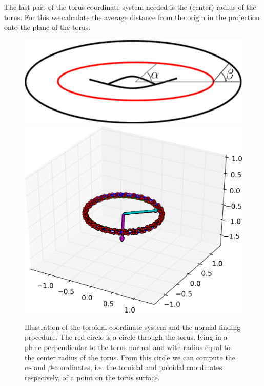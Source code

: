 \documentclass[a4paper]{article}
\begin{document}
The last part of the torus coordinate system needed is the (center) radius of the torus. For this we calculate the average distance from the origin in the projection onto the plane of the torus. %

\begin{figure}[!htb]
  \includegraphics[width=\linewidth]{Figures/TorusAlphaBeta.pdf}
\endminipage\hfill
{}
  \includegraphics[width=\linewidth]{Figures/torusfit3.png}
\endminipage
	\caption{Illustration of the toroidal coordinate system and the normal finding procedure. The red circle is a circle through the torus, lying in a plane perpendicular to the torus normal and with radius equal to the center radius of the torus. From this circle we can compute the $\alpha$- and $\beta$-coordinates, i.e. the toroidal and poloidal coordinates respecively, of a point on the torus surface.}\label{fig:coordsys}
\end{figure}
\end{document}
